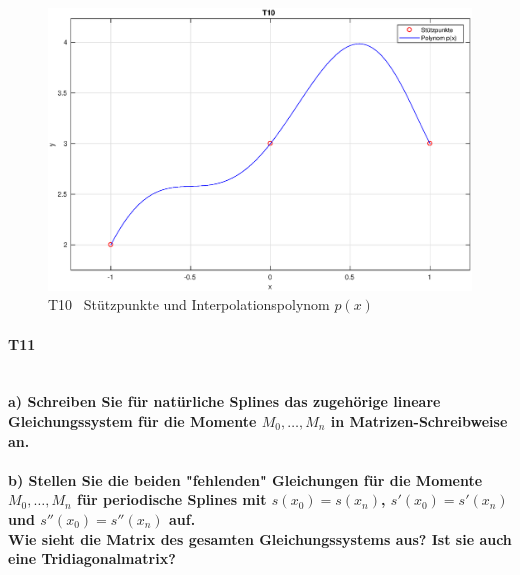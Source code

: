 \documentclass[10pt,a4paper]{article}
\begin{document}
	\begin{figure}[htbp]
		\centering
		\includegraphics[width=1.0\textwidth]{T10}
		\caption{T10 \, Stützpunkte und Interpolationspolynom $p(x)$}
	\end{figure}
	\newpage
	
	\paragraph{T11}\mbox{}\\
	\textbf{%
		a) Schreiben Sie für natürliche Splines das zugehörige lineare Gleichungssystem für die Momente $M_0, \dots, M_n$ in Matrizen-Schreibweise an.
	}\\ \\
	
	\textbf{%
		b) Stellen Sie die beiden "fehlenden" Gleichungen für die Momente $M_0, \dots, M_n$ für periodische Splines mit $s(x_0) = s(x_n)$, $s′(x_0) = s′(x_n)$ und $s''(x_0)=s''(x_n)$ auf. \\
		Wie sieht die Matrix des gesamten Gleichungssystems aus? Ist sie auch eine Tridiagonalmatrix?
	}
\end{document}
